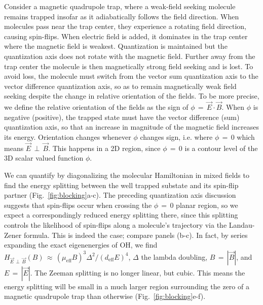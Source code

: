 \documentclass[%
 reprint,
 amsmath,amssymb,
 aps,
prl,
]{revtex4-1}
\newcommand{\epb}{{$\vec{E}\,{\perp}\,\vec{B}$}}
\newcommand{\epbm}{{\vec{E}\,{\perp}\,\vec{B}}}
\begin{document}
Consider a magnetic quadrupole trap, where a weak-field seeking molecule remains trapped insofar as it adiabatically follows the field direction. 
When molecules pass near the trap center, they experience a rotating field direction, causing spin-flips. 
When electric field is added, it dominates in the trap center where the magnetic field is weakest. 
Quantization is maintained but the quantization axis does not rotate with the magnetic field. 
Further away from the trap center the molecule is then magnetically strong field seeking and is lost. 
To avoid loss, the molecule must switch from the vector sum quantization axis to the vector difference quantization axis, so as to remain magnetically weak field seeking despite the change in relative orientation of the fields. 
To be more precise, we define the relative orientation of the fields as the sign of $\phi\,{=}\,\vec{E}\cdot\vec{B}$. 
When $\phi$ is negative (positive), the trapped state must have the vector difference (sum) quantization axis, so that an increase in magnitude of the magnetic field increases its energy. 
Orientation changes whenever $\phi$ changes sign, i.e. where $\phi\,{=}\,0$ which means \epb. 
This happens in a 2D region, since $\phi\,{=}\,0$ is a contour level of the 3D scalar valued function $\phi$. 

We can quantify by diagonalizing the molecular Hamiltonian in mixed fields to find the energy splitting between the well trapped substate and its spin-flip partner (Fig.~\ref{fig:blocking}a-c). 
The preceding quantization axis discussion suggests that spin-flips occur when crossing the $\phi\,{=}\,0$ planar region, so we expect a correspondingly reduced energy splitting there, since this splitting controls the likelihood of spin-flips along a molecule's trajectory via the Landau-Zener formula. 
This is indeed the case; compare panels (b-c). In fact, by series expanding the exact eigenenergies of OH, we find $H_\epbm(B)\,{\approx}\,(\mu_\text{eff}B)^3\Delta^2/(d_\text{eff}E)^4$, $\Delta$ the lambda doubling, $B\,{=}\,|\vec{B}|$, and $E\,{=}\,|\vec{E}|$. 
The Zeeman splitting is no longer linear, but cubic. 
This means the energy splitting will be small in a much larger region surrounding the zero of a magnetic quadrupole trap than otherwise (Fig.~\ref{fig:blocking}e-f).
\end{document}
